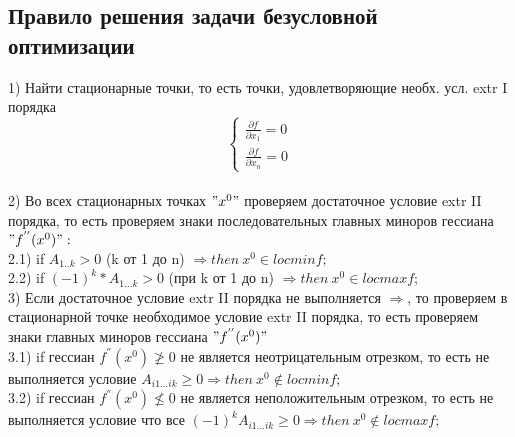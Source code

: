 \subsection*{Правило решения задачи безусловной оптимизации}
1) Найти стационарные точки, то есть точки, удовлетворяющие необх. усл. extr I порядка \\
$$
\begin{cases}
\frac{\partial f}{\partial x_1} = 0 \\
\frac{\partial f}{\partial x_n} = 0
\end{cases}
$$
\\
2) Во всех стационарных точках $"x^0"$ проверяем достаточное условие extr II порядка, то есть проверяем знаки последовательных главных миноров гессиана $"f^{''}(x^0)":$ \\
2.1) if $A_{1..k}>0$ (k от 1 до n) $\Rightarrow then \ x^0 \in locminf;$ \\
2.2) if $(-1)^k*A_{1...k} > 0$ (при k от 1 до n) $\Rightarrow then \ x^0 \in locmaxf;$ \\
3) Если достаточное условие extr II порядка не выполняется $\Rightarrow$, то проверяем в стационарной точке необходимое условие extr II порядка, то есть проверяем знаки главных миноров гессиана $"f^{''}(x^0)"$ \\
3.1) if гессиан $f^{''}(x^0) \ngeq 0$ не является неотрицательным отрезком, то есть не выполняется условие $A_{i1...ik} \geq 0 \Rightarrow then \ x^0 \notin locminf;$ \\
3.2) if гессиан $f^{''}(x^0) \nleq 0$ не является неположительным отрезком, то есть не выполняется условие что все $(-1)^{k}A_{i1...ik} \geq 0 \Rightarrow then \ x^0 \notin locmaxf;$ \\

